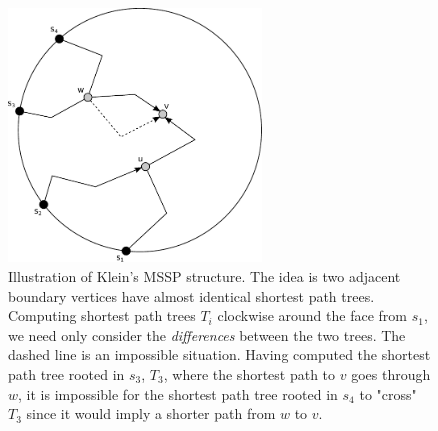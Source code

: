 \begin{figure}[h!]
  \centering
  \includegraphics[width=0.6\textwidth]{figs/klein.pdf}
  \caption{Illustration of Klein's MSSP structure. The idea is two adjacent boundary
    vertices have almost identical shortest path trees. Computing shortest path trees
    $T_i$ clockwise
    around the face from $s_1$, we need only consider the \textit{differences} between
  the two trees. The dashed line is an impossible situation. Having computed the shortest
path tree rooted in $s_3$, $T_3$, where the shortest path to $v$ goes through $w$, it is
impossible for the shortest path tree rooted in $s_4$ to "cross" $T_3$ since it would
imply a shorter path from $w$ to $v$.}
    \label{klein}
\end{figure}

